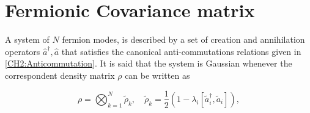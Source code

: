 
\section{Fermionic Covariance matrix }
A system of $N$ fermion modes, is described by a set of creation and annihilation operators $\hat{a}^{\dagger}, \hat{a}$ that satisfies the canonical anti-commutations relations given in \eqref{CH2:Anticommutation}. It is said that the system is Gaussian whenever the correspondent density matrix $\rho$ can be written as \cite{cheong_many-body_2003}

\begin{equation}
\rho=\bigotimes_{k=1}^{N} \tilde{\rho}_{k}, \quad \tilde{\rho}_{k}=\frac{1}{2}\left(1-\lambda_{i}\left[\tilde{a}_{i}^{\dagger}, \tilde{a}_{i}\right]\right),
\label{CH2:rho_gaussiano_no_exp}
\end{equation}


